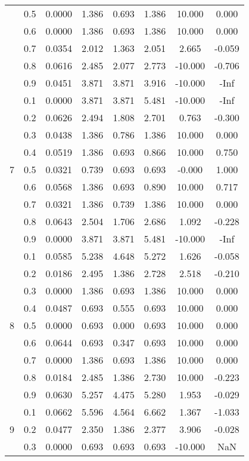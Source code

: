 \documentclass[11pt,a4paper]{report}
\begin{document}
\begin{longtable}{ | c | c || c | c | c | c | c | c | }
 & 0.5 & 0.0000 & 1.386 & 0.693 & 1.386 & 10.000 & 0.000 \\
 & 0.6 & 0.0000 & 1.386 & 0.693 & 1.386 & 10.000 & 0.000 \\
 & 0.7 & 0.0354 & 2.012 & 1.363 & 2.051 & 2.665 & -0.059 \\
 & 0.8 & 0.0616 & 2.485 & 2.077 & 2.773 & -10.000 & -0.706 \\
 & 0.9 & 0.0451 & 3.871 & 3.871 & 3.916 & -10.000 & -Inf \\
 \hline
\multirow{9}{*}{7} & 0.1 & 0.0000 & 3.871 & 3.871 & 5.481 & -10.000 & -Inf \\
 & 0.2 & 0.0626 & 2.494 & 1.808 & 2.701 & 0.763 & -0.300 \\
 & 0.3 & 0.0438 & 1.386 & 0.786 & 1.386 & 10.000 & 0.000 \\
 & 0.4 & 0.0519 & 1.386 & 0.693 & 0.866 & 10.000 & 0.750 \\
 & 0.5 & 0.0321 & 0.739 & 0.693 & 0.693 & -0.000 & 1.000 \\
 & 0.6 & 0.0568 & 1.386 & 0.693 & 0.890 & 10.000 & 0.717 \\
 & 0.7 & 0.0321 & 1.386 & 0.739 & 1.386 & 10.000 & 0.000 \\
 & 0.8 & 0.0643 & 2.504 & 1.706 & 2.686 & 1.092 & -0.228 \\
 & 0.9 & 0.0000 & 3.871 & 3.871 & 5.481 & -10.000 & -Inf \\
 \hline
\multirow{9}{*}{8} & 0.1 & 0.0585 & 5.238 & 4.648 & 5.272 & 1.626 & -0.058 \\
 & 0.2 & 0.0186 & 2.495 & 1.386 & 2.728 & 2.518 & -0.210 \\
 & 0.3 & 0.0000 & 1.386 & 0.693 & 1.386 & 10.000 & 0.000 \\
 & 0.4 & 0.0487 & 0.693 & 0.555 & 0.693 & 10.000 & 0.000 \\
 & 0.5 & 0.0000 & 0.693 & 0.000 & 0.693 & 10.000 & 0.000 \\
 & 0.6 & 0.0644 & 0.693 & 0.347 & 0.693 & 10.000 & 0.000 \\
 & 0.7 & 0.0000 & 1.386 & 0.693 & 1.386 & 10.000 & 0.000 \\
 & 0.8 & 0.0184 & 2.485 & 1.386 & 2.730 & 10.000 & -0.223 \\
 & 0.9 & 0.0630 & 5.257 & 4.475 & 5.280 & 1.953 & -0.029 \\
 \hline
\multirow{9}{*}{9} & 0.1 & 0.0662 & 5.596 & 4.564 & 6.662 & 1.367 & -1.033 \\
 & 0.2 & 0.0477 & 2.350 & 1.386 & 2.377 & 3.906 & -0.028 \\
 & 0.3 & 0.0000 & 0.693 & 0.693 & 0.693 & -10.000 & NaN \\

\end{longtable}
\end{document}

